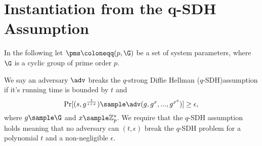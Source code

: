 \section{Instantiation from the q-SDH Assumption}
In the following let $\pms \coloneqq (p,\G) $ be a set of system parameters, where 
$\G $ is a cyclic group of prime order $p$.

\begin{definition}
We say an adversary $\adv$ breaks the $q$-strong Diffie Hellman ($q$-SDH)assumption if it's running time is bounded by $t$ and
$$\Pr[(s,g^{\frac{1}{s+x}}) \sample \adv(g,g^x,...,g^{x^q})] \geq \epsilon,$$
where 
$g \sample \G$ and $x \sample \mathbb{Z}_p^*$.
We require that the $q$-SDH assumption holds meaning that no adversary can $(t, \epsilon)$ break the $q$-SDH problem for a polynomial $t$ and a non-negligible $\epsilon$.
\end{definition}

